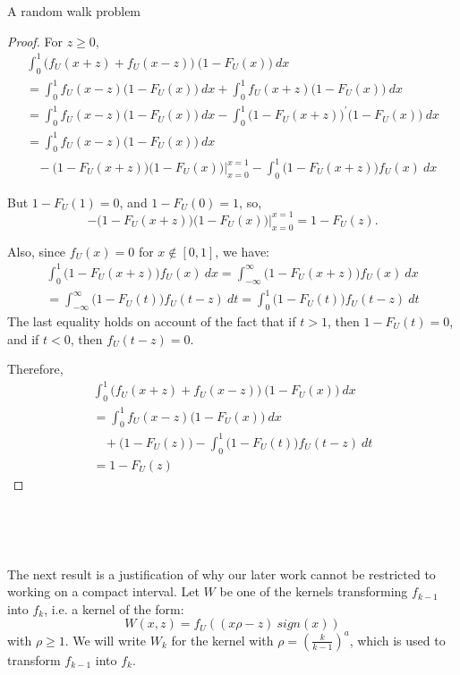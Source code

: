 \documentclass[12pt]{article}
\begin{document}
\begin{section}{A random walk problem}
\begin{proof}
  	For $z \ge 0$,
  	\begin{align*}
  	& \int_{0}^1 \big( f_U(x+z) + f_U(x-z) \big) \ \big(1 - F_U(x) \big) \ dx &\\
  	&= \int_{0}^1  f_U(x-z) \big(1 - F_U(x) \big) \ dx  + 
  	 \int_{0}^1  f_U(x+z) \big(1 - F_U(x) \big) \ dx &\\  	
  	&= \int_{0}^1  f_U(x-z) \big(1 - F_U(x) \big) \ dx 
  	- \int_{0}^1  \big( 1 - F_U(x+z) \big)^{'} \big(1 - F_U(x) \big) \ dx &\\
  	&= \int_{0}^1  f_U(x-z) \big(1 - F_U(x) \big) \ dx  &\\
  	&\ \ \ \ - \big( 1 - F_U(x+z) \big) \big(1 - F_U(x) \big) \Bigg|_{x=0}^{x=1} 
  	- \int_{0}^1  \big( 1 - F_U(x+z) \big) f_U(x)  \ dx &
  	\end{align*}  
  	
  	But $1-F_U(1)=0$, and $1-F_U(0)=1$, so,  
  	$$
  	- \big( 1 - F_U(x+z) \big) \big(1 - F_U(x) \big) \Bigg|_{x=0}^{x=1} =
  	1 - F_U(z).
  	$$  
  	
  	Also, since $f_U(x) = 0$ for $x \notin [0,1]$, we have:
  	\begin{align*}
  	&\int_{0}^1  \big( 1 - F_U(x+z) \big) f_U(x)  \ dx = \int_{-\infty}^{\infty}  \big( 1 - F_U(x+z) \big) f_U(x)  \ dx &\\
  	&= \int_{-\infty}^{\infty}  \big( 1 - F_U(t) \big) f_U(t-z)  \ dt = \int_0^1  \big( 1 - F_U(t) \big) f_U(t-z)  \ dt &
  	\end{align*}
  	The last equality holds on account of the fact that if $t > 1$, then $1 - F_U(t) = 0$, and if $t<0$, then $f_U(t-z) = 0 $.  
  	
  	
  	Therefore,
  	\begin{align*}
  	& \int_{0}^1 \big( f_U(x+z) + f_U(x-z) \big) \ \big(1 - F_U(x) \big) \ dx &\\
  	&= \int_{0}^1  f_U(x-z) \big(1 - F_U(x) \big) \ dx  &\\
  	&\ \ \ \ + \big( 1 - F_U(z) \big) - \int_0^1  \big( 1 - F_U(t) \big) f_U(t-z)  \ dt &\\
  	&=  1 - F_U(z)  &
  	\end{align*} 
    \end{proof}  


\

\

The next result is a justification of why our later work cannot be restricted to working on a compact interval. Let $W$ be one of the kernels transforming $f_{k-1}$ into $f_k$, i.e. a kernel of the form:
$$
W(x,z) = f_U\!\left(  \left(x \rho - z \right)\ sign(x) \right)
$$
with $\rho \ge 1$. We will write $W_k$ for the kernel with $\rho = (\frac{k}{k-1})^a$, which is used to transform $f_{k-1}$ into $f_k$.  


\end{section}
\end{document}
